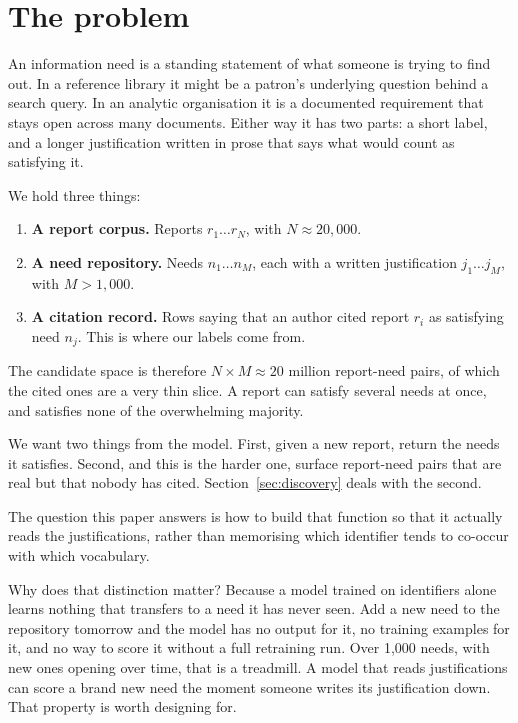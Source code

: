 \documentclass[11pt]{article}
\begin{document}
\section{The problem}

An information need is a standing statement of what someone is trying to find
out. In a reference library it might be a patron's underlying question behind a
search query. In an analytic organisation it is a documented requirement that
stays open across many documents. Either way it has two parts: a short label,
and a longer justification written in prose that says what would count as
satisfying it.

We hold three things:

\begin{enumerate}
  \item \textbf{A report corpus.} Reports $r_1 \ldots r_N$, with $N \approx
        20{,}000$.
  \item \textbf{A need repository.} Needs $n_1 \ldots n_M$, each with a written
        justification $j_1 \ldots j_M$, with $M > 1{,}000$.
  \item \textbf{A citation record.} Rows saying that an author cited report
        $r_i$ as satisfying need $n_j$. This is where our labels come from.
\end{enumerate}

The candidate space is therefore $N \times M \approx 20$ million report-need
pairs, of which the cited ones are a very thin slice. A report can satisfy
several needs at once, and satisfies none of the overwhelming majority.

We want two things from the model. First, given a new report, return the needs
it satisfies. Second, and this is the harder one, surface report-need pairs that
are real but that nobody has cited. Section~\ref{sec:discovery} deals with the
second.

The question this paper answers is how to build that function so that it
actually reads the justifications, rather than memorising which identifier tends
to co-occur with which vocabulary.

Why does that distinction matter? Because a model trained on identifiers alone
learns nothing that transfers to a need it has never seen. Add a new need to the
repository tomorrow and the model has no output for it, no training examples for
it, and no way to score it without a full retraining run. Over 1,000 needs, with
new ones opening over time, that is a treadmill. A model that reads
justifications can score a brand new need the moment someone writes its
justification down. That property is worth designing for.
\end{document}
